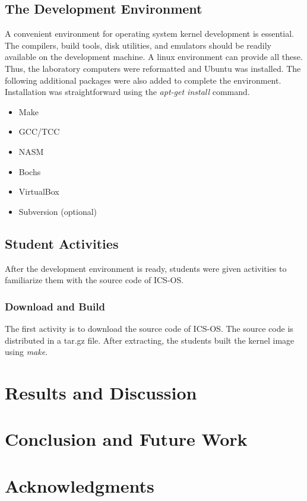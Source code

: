 \documentclass{acm_proc_article-sp}
\begin{document}
\subsection{The Development Environment}
A convenient environment for operating system kernel development is essential.
The compilers, build tools, disk utilities, and emulators should be readily 
available on the development machine. A linux environment can provide all these.
Thus, the laboratory computers were reformatted and Ubuntu was installed. 
The following additional packages were also added to complete the environment.
Installation was straightforward using the \textit{apt-get install} command.
\begin{itemize}
 \item Make
 \item GCC/TCC
 \item NASM
 \item Bochs
 \item VirtualBox
 \item Subversion (optional)
\end{itemize}

\subsection{Student Activities}
After the development environment is ready, students were given activities
to familiarize them with the source code of ICS-OS.

\subsubsection{Download and Build}
The first activity is to download the source code of ICS-OS\cite{icsos:site}.
The source code is distributed in a tar.gz file. After extracting, the students
built the kernel image using \textit{make}.


\section{Results and Discussion}

\section{Conclusion and Future Work}

\section{Acknowledgments}




\balancecolumns
\end{document}
